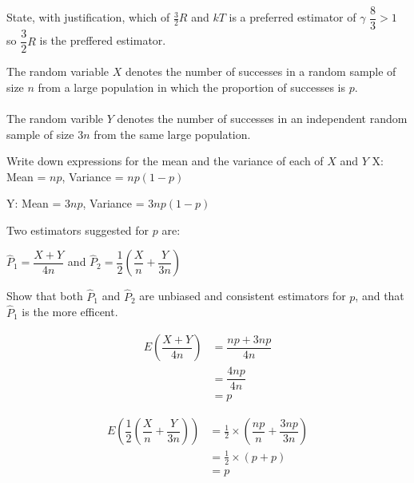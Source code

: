 \begin{example}
            \begin{step}{State, with justification, which of $\frac{3}{2}R$ and $kT$ is a preferred estimator of $\gamma$}
                $\dfrac{8}{3} > 1$ so $\dfrac{3}{2}R$ is the preffered estimator.
            \end{step}

        \end{example}

        \begin{example}
        {
            The random variable $X$ denotes the number of successes in a random sample of size $n$ from a large population in which the proportion of successes is $p$.
            \\\\
            The random varible $Y$ denotes the number of successes in an independent random sample of size $3n$ from the same large population.
        }

        \begin{step}{Write down expressions for the mean and the variance of each of $X$ and $Y$}
            X: Mean = $np$, Variance = $np(1-p)$

            Y: Mean = $3np$, Variance = $3np(1-p)$
        \end{step}

        \begin{step}
        {
            Two estimators suggested for $p$ are:
            \begin{center}
            $\hat{P}_1 = \dfrac{X + Y}{4n}$ and $\hat{P}_2 = \dfrac{1}{2}\left(\dfrac{X}{n} + \dfrac{Y}{3n}\right)$
            \end{center}
            Show that both $\hat{P}_1$ and $\hat{P}_2$ are unbiased and consistent estimators for $p$, and that $\hat{P}_1$ is the more efficent.
        }

        \begin{align*}
            E\left(\dfrac{X + Y}{4n}\right) &= \dfrac{np + 3np}{4n}     \\
            &= \dfrac{4np}{4n}                                          \\
            &= p
        \end{align*}
        
        \begin{align*}
            E\left(\dfrac{1}{2}\left(\dfrac{X}{n} + \dfrac{Y}{3n}\right)\right) &= \frac{1}{2} \times \left(\dfrac{np}{n}+\dfrac{3np}{3n}\right)    \\
            &= \frac{1}{2} \times (p + p) \\
            &= p
        \end{align*}


\end{step}
\end{example}
